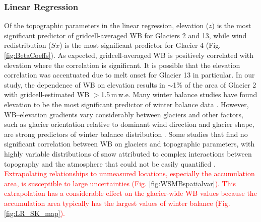 \documentclass[review,oneside, letterpaper]{igs}
\begin{document}
\subsubsection{Linear Regression}

Of the topographic parameters in the linear regression, elevation ($z$) is the most significant predictor of gridcell-averaged WB for Glaciers 2 and 13, while wind redistribution ($Sx$) is the most significant predictor for Glacier 4 (Fig. \ref{fig:BetaCoeffs}). As expected, gridcell-averaged WB is positively correlated with elevation where the correlation is significant. It is possible that the elevation correlation was accentuated due to melt onset for Glacier 13 in particular. In our study, the dependence of WB on elevation results in $\sim$1\% of the area of Glacier 2 with gridcell-estimated WB $>$1.5\,m\,w.e.  Many winter balance studies have found elevation to be the most significant predictor of winter balance data \citep[e.g.][]{Machguth2006, McGrath2015}. However, WB--elevation gradients vary considerably between glaciers \citep[e.g.][]{Winther1998} and other factors, such as glacier orientation relative to dominant wind direction and glacier shape, are strong predictors of winter balance distribution \citep{Machguth2006,Grabiec2011}. Some studies that find no significant correlation between WB on glaciers and topographic parameters, with highly variable distributions of snow attributed to complex interactions between topography and the atmosphere that could not be easily quantified \citep[e.g.][]{Grabiec2011,Lopez2011}. \textcolor{red}{Extrapolating relationships to unmeasured locations, especially the accumulation area, is susceptible to large uncertainties (Fig. \ref{fig:WSMBspatialvar}). This extrapolation has a considerable effect on the glacier-wide WB values because the accumulation area typically has the largest values of winter balance (Fig. \ref{fig:LR_SK_map}). }
\end{document}
